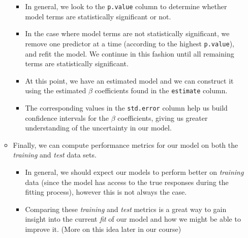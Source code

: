 \documentclass[
  letterpaper,
  DIV=11,
  numbers=noendperiod]{scrartcl}
\providecommand{\tightlist}{%
  \setlength{\itemsep}{0pt}\setlength{\parskip}{0pt}}\usepackage{longtable,booktabs,array}
\begin{document}
\begin{itemize}
\begin{itemize}
    \begin{itemize}
    \tightlist
    \item
      In general, we look to the \texttt{p.value} column to determine
      whether model terms are statistically significant or not.
    \item
      In the case where model terms are not statistically significant,
      we remove one predictor at a time (according to the highest
      \texttt{p.value}), and refit the model. We continue in this
      fashion until all remaining terms are statistically significant.
    \item
      At this point, we have an estimated model and we can construct it
      using the estimated \(\beta\) coefficients found in the
      \texttt{estimate} column.
    \item
      The corresponding values in the \texttt{std.error} column help us
      build confidence intervals for the \(\beta\) coefficients, giving
      us greater understanding of the uncertainty in our model.
    \end{itemize}
  \item
    Finally, we can compute performance metrics for our model on both
    the \emph{training} and \emph{test} data sets.

    \begin{itemize}
    \tightlist
    \item
      In general, we should expect our models to perform better on
      \emph{training} data (since the model has access to the true
      responses during the fitting process), however this is not always
      the case.
    \item
      Comparing these \emph{training} and \emph{test} metrics is a great
      way to gain insight into the current \emph{fit} of our model and
      how we might be able to improve it. (More on this idea later in
      our course)
    \end{itemize}
  \end{itemize}
\end{itemize}
\end{document}
